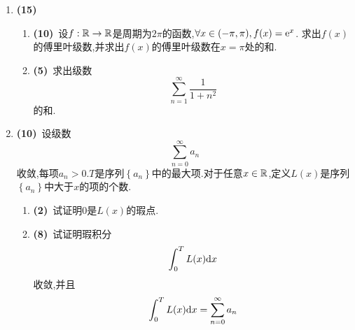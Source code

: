 \documentclass{ctexart}
\begin{document}
\begin{enumerate}[leftmargin=*,label=\textbf{\arabic*.},topsep=0pt,parsep=0pt,itemsep=0pt,partopsep=0pt]
    \item \textbf{(15)}
        \begin{enumerate}[label=\tbf{(\arabic*)},topsep=0pt,parsep=0pt,itemsep=0pt,partopsep=0pt]
            \item \textbf{(10)}\ 设$f:\mathbb{R}\to\mathbb{R}$是周期为$2\pi$的函数,$\forall x\in(-\pi,\pi),f(x)=\mathrm{e}^x$.%
                求出$f(x)$的傅里叶级数,并求出$f(x)$的傅里叶级数在$x=\pi$处的和.
            \item \textbf{(5)}\ 求出级数
                \[\sum_{n=1}^{\infty}\dfrac{1}{1+n^2}\]
                的和.
        \end{enumerate}

    \item \textbf{(10)}\ 设级数
        \[\sum_{n=0}^{\infty}a_n\]
        收敛,每项$a_n>0$.$T$是序列$\left\{a_n\right\}$中的最大项.对于任意$x\in\mathbb{R}$,定义$L(x)$是序列$\left\{a_n\right\}$中大于$x$的项的个数.
        \begin{enumerate}[label=\tbf{(\arabic*)},topsep=0pt,parsep=0pt,itemsep=0pt,partopsep=0pt]
            \item \textbf{(2)}\ 试证明$0$是$L(x)$的瑕点.
            \item \textbf{(8)}\ 试证明瑕积分
                \[\int_0^TL(x)\mathrm{d} x\]
                收敛,并且
                \[\int_0^TL(x)\mathrm{d} x=\sum_{n=0}^{\infty}a_n\]
        \end{enumerate}
    
\end{enumerate}
\end{document}
